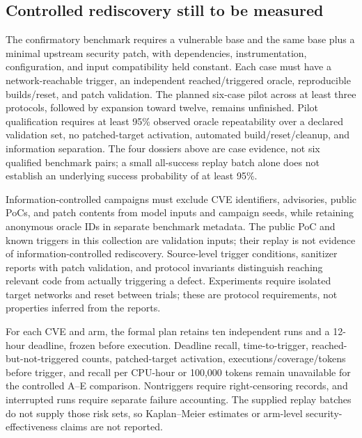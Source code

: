 \subsection{Controlled rediscovery still to be measured}
The confirmatory benchmark requires a vulnerable base and the same base plus a minimal upstream security patch, with dependencies, instrumentation, configuration, and input compatibility held constant. Each case must have a network-reachable trigger, an independent reached/triggered oracle, reproducible builds/reset, and patch validation. The planned six-case pilot across at least three protocols, followed by expansion toward twelve, remains unfinished. Pilot qualification requires at least 95\% observed oracle repeatability over a declared validation set, no patched-target activation, automated build/reset/cleanup, and information separation. The four dossiers above are case evidence, not six qualified benchmark pairs; a small all-success replay batch alone does not establish an underlying success probability of at least 95\%.

Information-controlled campaigns must exclude CVE identifiers, advisories, public PoCs, and patch contents from model inputs and campaign seeds, while retaining anonymous oracle IDs in separate benchmark metadata. The public PoC and known triggers in this collection are validation inputs; their replay is not evidence of information-controlled rediscovery. Source-level trigger conditions, sanitizer reports with patch validation, and protocol invariants distinguish reaching relevant code from actually triggering a defect. Experiments require isolated target networks and reset between trials; these are protocol requirements, not properties inferred from the reports.

For each CVE and arm, the formal plan retains ten independent runs and a 12-hour deadline, frozen before execution. Deadline recall, time-to-trigger, reached-but-not-triggered counts, patched-target activation, executions/coverage/tokens before trigger, and recall per CPU-hour or 100,000 tokens remain unavailable for the controlled A--E comparison. Nontriggers require right-censoring records, and interrupted runs require separate failure accounting. The supplied replay batches do not supply those risk sets, so Kaplan--Meier estimates or arm-level security-effectiveness claims are not reported.
